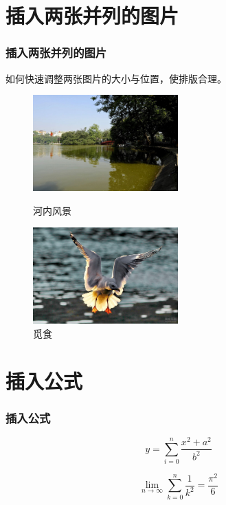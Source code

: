 \documentclass[notheorems,mathserif,table,compress]{beamer}  %
\begin{document}
\section{插入两张并列的图片}
\begin{frame}
  \frametitle{插入两张并列的图片}
如何快速调整两张图片的大小与位置，使排版合理。
\begin{figure}[!ht]
  \begin{minipage}[t]{0.5\textwidth}	
  \centering
  \includegraphics[width=2.2in]{view.jpg}
  \caption{河内风景}
  \end{minipage}
  \begin{minipage}[t]{0.4\textwidth}
  \centering
  \includegraphics[width=2.2in]{bird.jpg}%
  \caption{觅食}
  \end{minipage}
  \end{figure} 

\end{frame}
\section{插入公式}
\begin{frame}
  \frametitle{插入公式}
 $$y=\sum_{i=0}^{n}\frac{x^2+a^2}{b^2}$$

 $$\lim_{n \to \infty}
\sum_{k=0}^n \frac{1}{k^2}
= \frac{\pi^2}{6}$$
\end{frame}
\end{document}
